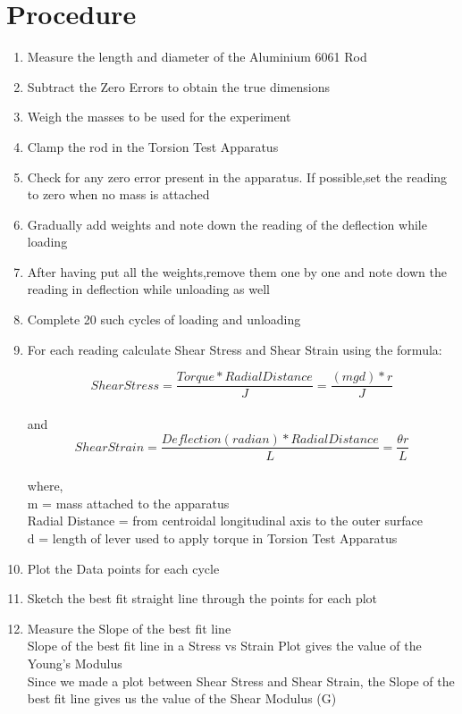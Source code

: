 \documentclass[12pt,a4paper]{article}	%
\begin{document}
\section{Procedure}
\begin{enumerate}
\item Measure the length and diameter of the Aluminium 6061 Rod
\item Subtract the Zero Errors to obtain the true dimensions
\item Weigh the masses to be used for the experiment
\item Clamp the rod in the Torsion Test Apparatus
\item Check for any zero error present in the apparatus. If possible,set the reading to zero when no mass is attached
\item Gradually add weights and note down the reading of the deflection while loading
\item After having put all the weights,remove them one by one and note down the reading in deflection while unloading as well
\item Complete 20 such cycles of loading and unloading
\item For each reading calculate Shear Stress and Shear Strain using the formula:

\[Shear Stress = \frac{Torque*Radial Distance}{J}=\frac{(mgd)*r}{J}\]\\
and
\[Shear Strain = \frac{Deflection(radian)*Radial Distance}{L} = \frac{\theta r}{L}\]\\
where,\\
m = mass attached to the apparatus\\
Radial Distance = from centroidal longitudinal axis to the outer surface\\
d = length of lever used to apply torque in Torsion Test Apparatus
\item Plot the Data points for each cycle
\item Sketch the best fit straight line through the points for each plot
\item Measure the Slope of the best fit line\\

Slope of the best fit line in a Stress vs Strain Plot gives the value of the Young's Modulus\\

Since we made a plot between Shear Stress and Shear Strain, the Slope of the best fit line gives us the value of the Shear Modulus (G)
\end{enumerate}
\thispagestyle{empty}	%
\end{document}
